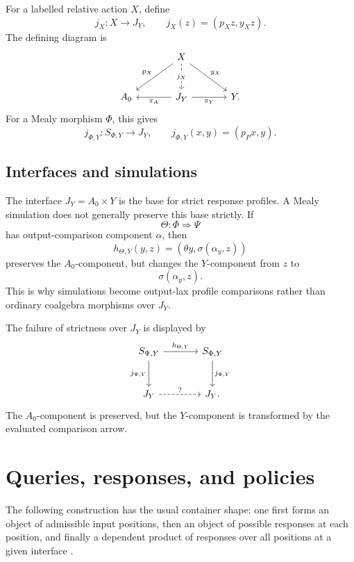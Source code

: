 For a labelled relative action \(X\), define
\[
j_X:X\to J_Y,
\qquad
j_X(z)=(p_Xz,y_Xz).
\]
The defining diagram is
\[
\begin{tikzcd}[column sep=large,row sep=large]
&
X
  \arrow[dl,"p_X"']
  \arrow[dr,"y_X"]
  \arrow[d,dashed,"j_X" description]
&
\\
A_0
&
J_Y
  \arrow[l,"\pi_A"]
  \arrow[r,"\pi_Y"']
&
Y .
\end{tikzcd}
\]
For a Mealy morphism \(\Phi\), this gives
\[
j_{\Phi,Y}:S_{\Phi,Y}\to J_Y,
\qquad
j_{\Phi,Y}(x,y)=(p_Px,y).
\]

\subsection{Interfaces and simulations}
\label{subsec:poly-relative-interface-simulations}

\begin{remark}
\label{rem:poly-relative-interface-and-simulations}
The interface \(J_Y=A_0\times Y\) is the base for strict response profiles.  A
Mealy simulation does not generally preserve this base strictly.  If
\[
\Theta:\Phi\Rightarrow\Psi
\]
has output-comparison component \(\alpha\), then
\[
h_{\Theta,Y}(y,z)
=
(\theta y,\sigma(\alpha_y,z))
\]
preserves the \(A_0\)-component, but changes the \(Y\)-component from \(z\) to
\[
\sigma(\alpha_y,z).
\]
This is why simulations become output-lax profile comparisons rather than
ordinary coalgebra morphisms over \(J_Y\).
\end{remark}

The failure of strictness over \(J_Y\) is displayed by
\[
\begin{tikzcd}[column sep=large,row sep=large]
S_{\Psi,Y}
  \arrow[r,"h_{\Theta,Y}"]
  \arrow[d,"j_{\Psi,Y}"']
&
S_{\Phi,Y}
  \arrow[d,"j_{\Phi,Y}"]
\\
J_Y
  \arrow[r,dashed,"?"]
&
J_Y .
\end{tikzcd}
\]
The \(A_0\)-component is preserved, but the \(Y\)-component is transformed by
the evaluated comparison arrow.

\section{Queries, responses, and policies}
\label{sec:poly-relative-queries-responses}

The following construction has the usual container shape: one first forms an
object of admissible input positions, then an object of possible responses at
each position, and finally a dependent product of responses over all positions
at a given interface \cite{AbbottAltenkirchGhani2005Containers}.

